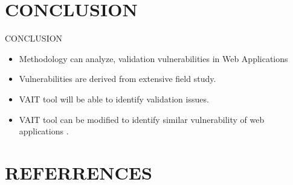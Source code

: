 \documentclass[xcolor=x11names,compress]{beamer}
\renewcommand{\(}{\begin{columns}}
\renewcommand{\)}{\end{columns}}
\newcommand{\<}[1]{\begin{column}{#1}}
\renewcommand{\>}{\end{column}}
\begin{document}
\section{CONCLUSION}
\begin{frame}
\end{frame}
\begin{frame}{CONCLUSION}
	\begin{itemize}
		\item Methodology can analyze, validation vulnerabilities in Web Applications \newline
		\item Vulnerabilities are derived from extensive field study.\newline
		\item VAIT tool will be able to identify validation issues.\newline
		\item VAIT tool can be modified to identify similar vulnerability of web applications .
	\end{itemize}
\end{frame}
\section*{REFERRENCES}
\begin{frame}
\end{frame}
\end{document}

